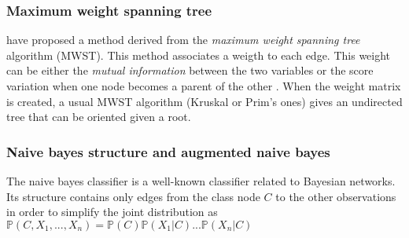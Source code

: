 \subsubsection{Maximum weight spanning tree}

\cite{Cho68} have proposed a method derived from the \emph{maximum weight spanning tree} algorithm (MWST).
This method associates a weigth to each edge. This weight can be either the \emph{mutual information} between the two variables \cite{Cho68} or the score variation when one node becomes a parent of the other \cite{Hec94}.
When the weight matrix is created, a usual MWST algorithm (Kruskal or Prim's ones) gives an undirected tree that can be oriented given a root.
\vspace*{-1.25\baselineskip}


\subsubsection{Naive bayes structure and augmented naive bayes}

The naive bayes classifier is a well-known classifier related to Bayesian networks. Its structure contains only edges from the class node $C$ to the other observations in order to simplify the joint distribution as
$\mathbb{P}(C,X_1,...,X_n)=\mathbb{P}(C)\mathbb{P}(X_1|C)...\mathbb{P}(X_n|C)$
\vspace*{-1.25\baselineskip}

